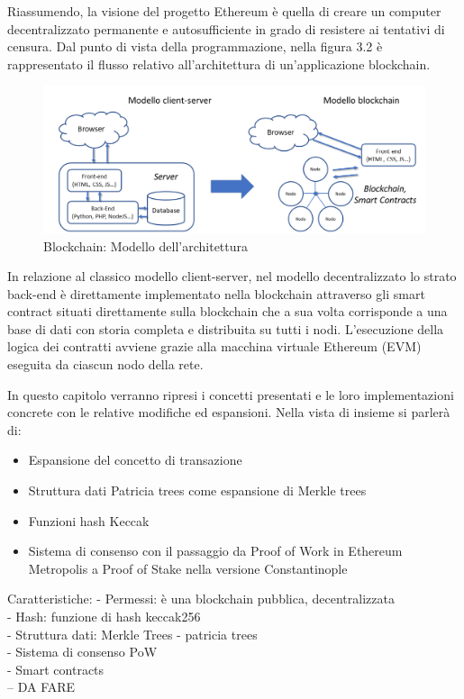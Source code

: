 Riassumendo, la visione del progetto Ethereum è quella di creare un computer decentralizzato permanente e autosufficiente in grado di resistere ai tentativi di censura. Dal punto di vista della programmazione, nella figura 3.2 è rappresentato il flusso relativo all’architettura di un’applicazione blockchain.

\begin{figure}[H]
\centering
\includegraphics[width=1\textwidth]{immagini/architetturav1.png}
\caption{Blockchain: Modello dell'architettura}
\label{fig:mesh8}
\end{figure}

In relazione al classico modello client-server, nel modello decentralizzato lo strato back-end è direttamente implementato nella blockchain attraverso gli smart contract situati direttamente sulla blockchain che a sua volta corrisponde a una base di dati con storia completa e distribuita su tutti i nodi. L’esecuzione della logica dei contratti avviene grazie alla macchina virtuale Ethereum (EVM) eseguita da ciascun nodo della rete.


In questo capitolo verranno ripresi i concetti presentati e le loro implementazioni concrete con le relative modifiche ed espansioni. Nella vista di insieme si parlerà di:

\begin{itemize}
\item Espansione del concetto di transazione
\item Struttura dati Patricia trees come espansione di Merkle trees
\item Funzioni hash Keccak
\item Sistema di consenso con il passaggio da Proof of Work in Ethereum Metropolis  a Proof of Stake nella versione Constantinople
\end{itemize}

Caratteristiche: 
- Permessi: è una blockchain pubblica, decentralizzata\\
- Hash: funzione di hash keccak256\\
- Struttura dati: Merkle Trees - patricia trees\\
- Sistema di consenso PoW\\
- Smart contracts\\
-- DA FARE\\

